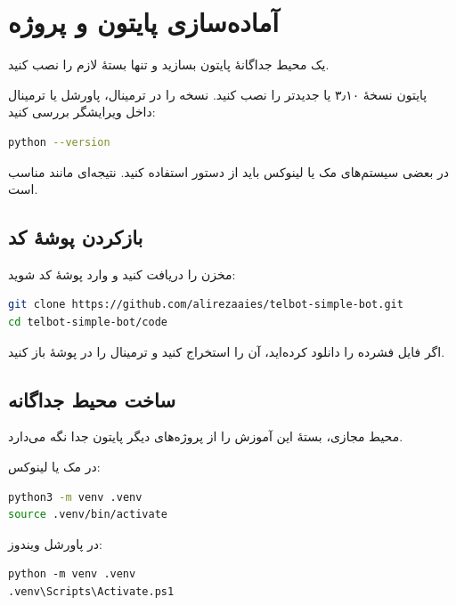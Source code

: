 \chapter{آماده‌سازی پایتون و پروژه}

\begin{goalbox}
یک محیط جداگانهٔ پایتون بسازید و تنها بستهٔ لازم را نصب کنید.
\end{goalbox}

پایتون نسخهٔ ۳٫۱۰ یا جدیدتر را نصب کنید. نسخه را در ترمینال، پاورشل یا ترمینال
داخل ویرایشگر بررسی کنید:

\begin{LTR}
\begin{lstlisting}[language=bash,numbers=none]
python --version
\end{lstlisting}
\end{LTR}

در بعضی سیستم‌های مک یا لینوکس باید از دستور
استفاده کنید. نتیجه‌ای مانند
مناسب است.

\section{بازکردن پوشهٔ کد}

مخزن را دریافت کنید و وارد پوشهٔ کد شوید:

\begin{LTR}
\begin{lstlisting}[language=bash,numbers=none]
git clone https://github.com/alirezaaies/telbot-simple-bot.git
cd telbot-simple-bot/code
\end{lstlisting}
\end{LTR}

اگر فایل فشرده را دانلود کرده‌اید، آن را استخراج کنید و ترمینال را در پوشهٔ
باز کنید.

\section{ساخت محیط جداگانه}

محیط مجازی، بستهٔ این آموزش را از پروژه‌های دیگر پایتون جدا نگه می‌دارد.

در مک یا لینوکس:
\begin{LTR}
\begin{lstlisting}[language=bash,numbers=none]
python3 -m venv .venv
source .venv/bin/activate
\end{lstlisting}
\end{LTR}

در پاورشل ویندوز:
\begin{LTR}
\begin{lstlisting}[language={},numbers=none]
python -m venv .venv
.venv\Scripts\Activate.ps1
\end{lstlisting}
\end{LTR}

